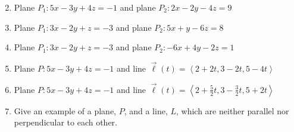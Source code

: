 \documentclass[12pt]{article}
\newif\ifans
\begin{document}

\begin{enumerate}
\setcounter{enumi}{1}

\item Plane $P_1:5x-3y+4z=-1$ and plane $P_2: 2x-2y-4z=9$

\ifans{\fbox{The planes are perpendicular.}} \fi

\item Plane $P_1: 3x-2y+z=-3$ and plane $P_2: 5x+y-6z=8$

\ifans{\fbox{The planes are neither parallel nor perpendicular; Detailed Solution: \textcolor{blue}{\href{http://www.math.drexel.edu/classes/Calculus/resources/Math200HW/Solutions/06_200_Planes_03.pdf}{Here}}}} \fi

\item Plane $P_1: 3x-2y+z=-3$ and plane $P_2: -6x+4y-2z=1$

\ifans{\fbox{The planes are parallel.}} \fi

\item Plane $P:5x-3y+4z=-1$ and line $\overrightarrow{\ell}(t)=\left\langle2+2t, 3-2t, 5-4t\right\rangle$

\ifans{\fbox{The plane and the line are parallel.}} \fi

\item Plane $P:5x-3y+4z=-1$ and line $\overrightarrow{\ell}(t)=\left\langle2+\frac{5}{2}t, 3-\frac{3}{2}t, 5+2t\right\rangle$

\ifans{\fbox{The plane and the line are perpendicular.}} \fi

\item Give an example of a plane, $P$, and a line, $L$, which are neither parallel nor perpendicular to each other.

\ifans{\fbox{\parbox{1\linewidth}{Suppose your line has the form $\overrightarrow{\ell}(t)=\overrightarrow{\ell_0}+t\overrightarrow{v}$ and that your plane has $\overrightarrow{n}$ as a normal vector.  Then all possible answers are those for which $\overrightarrow{v} \not\parallel \overrightarrow{n}$ (i.e., $\overrightarrow{v}\neq c\overrightarrow{n}$ for any scalar $c$) and $\overrightarrow{v} \not\perp \overrightarrow{n}$ (i.e., $\overrightarrow{v}\cdot\overrightarrow{n}\neq 0$).  The first condition ensures that $L$ and $P$ are not perpendicular; the second condition ensures that $L$ and $P$ are not parallel.}}} \fi

\end{enumerate}
\end{document}
